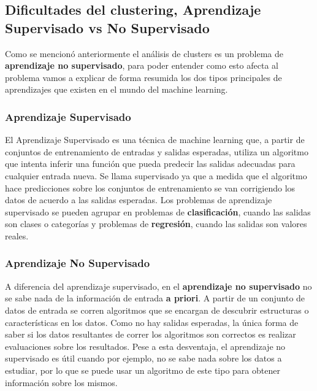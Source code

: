 \documentclass[8pt,a4paper]{article}
\begin{document}
\subsection{Dificultades del clustering, Aprendizaje Supervisado vs No Supervisado}
Como se mencionó anteriormente el análisis de clusters es un problema de \textbf{aprendizaje no supervisado}, para poder entender como esto afecta al problema vamos a explicar de forma resumida los dos tipos principales de aprendizajes que existen en el mundo del machine learning.

\subsubsection*{Aprendizaje Supervisado}
El Aprendizaje Supervisado es una técnica de machine learning que, a partir de conjuntos de entrenamiento de entradas y salidas esperadas, utiliza un algoritmo que intenta inferir una función que pueda predecir las salidas adecuadas para cualquier entrada nueva. Se llama supervisado ya que a medida que el algoritmo hace predicciones sobre los conjuntos de entrenamiento se van corrigiendo los datos de acuerdo a las salidas esperadas. Los problemas de aprendizaje supervisado se pueden agrupar en problemas de \textbf{clasificación}, cuando las salidas son clases o categorías y problemas de \textbf{regresión}, cuando las salidas son valores reales.

\subsubsection*{Aprendizaje No Supervisado}
A diferencia del aprendizaje supervisado, en el \textbf{aprendizaje no supervisado} no se sabe nada de la información de entrada \textbf{a priori}. A partir de un conjunto de datos de entrada se corren algoritmos que se encargan de descubrir estructuras o características en los datos. Como no hay salidas esperadas, la única forma de saber si los datos resultantes de correr los algoritmos son correctos es realizar evaluaciones sobre los resultados. Pese a esta desventaja, el aprendizaje no supervisado es útil cuando por ejemplo, no se sabe nada sobre los datos a estudiar, por lo que se puede usar un algoritmo de este tipo para obtener información sobre los mismos.
\end{document}
